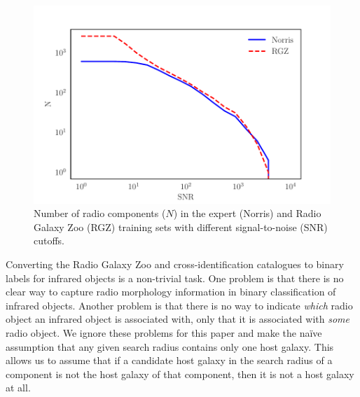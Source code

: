 \documentclass[fleqn,usenatbib,usedcolumn]{mnras}
\begin{document}
    \begin{figure}
      \centering
      \includegraphics[width=\columnwidth]{images/snr_cutoff_cumulative.pdf}
      \caption{Number of radio components ($N$) in the expert (Norris) and Radio Galaxy
        Zoo (RGZ) training sets with different signal-to-noise (SNR) cutoffs.}
      \label{fig:distribution-cutoffs}
    \end{figure}

    Converting the Radio Galaxy Zoo and \citet{norris06} cross-identification
    catalogues to binary labels for infrared objects is a non-trivial task. One problem is that there is no clear way to capture radio morphology
    information in binary classification of infrared objects. Another problem is that there is no way to indicate
    \emph{which} radio object an infrared object is associated with, only that
    it is associated with \emph{some} radio object. We ignore these problems
    for this paper and make the na\"ive
    assumption that any given search radius contains only one host galaxy. This allows us to assume that if a candidate host galaxy in the search radius of a component is not the host galaxy of that component, then it is not a host galaxy at all.
\end{document}
